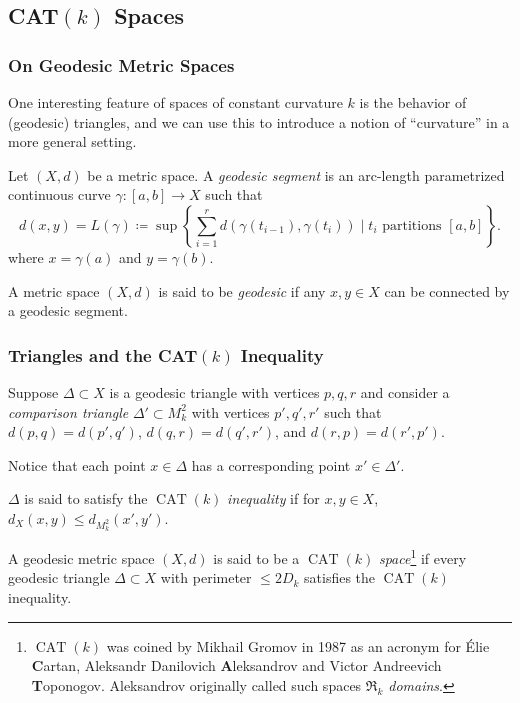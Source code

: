 \documentclass{beamer}
\DeclareMathOperator{\CAT}{CAT}
\theoremstyle{definition}
\begin{document}
\subsection{CAT$(k)$ Spaces}

\begin{frame}
    \frametitle{On Geodesic Metric Spaces}

    One interesting feature of spaces of constant curvature $k$ is the behavior
    of (geodesic) triangles, and we can use this to introduce a notion of ``curvature''
    in a more general setting.

    \begin{definition}
        Let $(X,d)$ be a metric space. A \emph{geodesic segment} is an arc-length parametrized
        continuous curve $\gamma : [a,b] \to X$ such that
        \[
          d(x,y) = L(\gamma)
          \coloneqq \sup\left\{\sum_{i=1}^r d(\gamma(t_{i-1}),\gamma(t_i))
          \mid t_i \text{ partitions } [a,b] \right\}.
        \]
        where $x = \gamma(a)$ and $y = \gamma(b)$.

        A metric space $(X,d)$ is said to be \emph{geodesic} if any $x, y \in X$ can be connected
        by a geodesic segment.
    \end{definition}

\end{frame}

\begin{frame}
    \frametitle{Triangles and the CAT$(k)$ Inequality}

    Suppose $\Delta \subset X$ is a geodesic triangle with vertices $p,q,r$ and consider a
    \emph{comparison triangle} $\Delta' \subset M_k^2$ with vertices $p',q',r'$ such that
    $d(p,q) = d(p',q')$, $d(q,r) = d(q',r')$, and $d(r,p) = d(r',p')$.

    Notice that each point $x \in \Delta$ has a corresponding point $x' \in \Delta'$.

    $\Delta$ is said to satisfy the $\CAT(k)$
    \emph{inequality} if for $x, y \in X$, $d_X(x,y) \leq d_{M^2_k}(x',y')$.

    \begin{definition}
        A geodesic metric space $(X,d)$ is said to be a $\CAT(k)$ \emph{space}\footnote{$\CAT(k)$
        was coined by Mikhail Gromov in 1987 as an acronym for Élie \textbf{C}artan,
        Aleksandr Danilovich \textbf{A}leksandrov and Victor Andreevich \textbf{T}oponogov.
        Aleksandrov originally called such spaces \emph{$\mathfrak{R}_k$ domains}.}
        if every geodesic triangle $\Delta \subset X$ with perimeter $\leq 2D_k$
        satisfies the $\CAT(k)$ inequality.
    \end{definition}

\end{frame}
\end{document}
